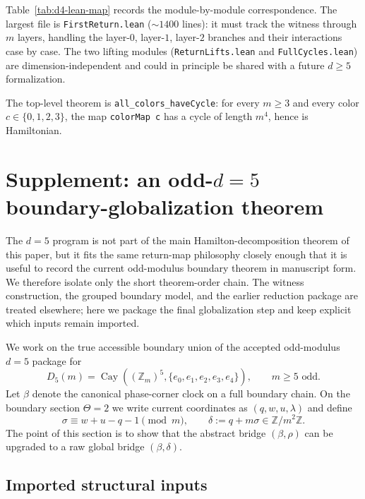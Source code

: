\documentclass[11pt]{article}
\newcommand{\Zm}{\mathbb Z_m}
\begin{document}
Table~\ref{tab:d4-lean-map} records the module-by-module correspondence.
The largest file is \texttt{FirstReturn.lean} (${\sim}1400$ lines): it must track the witness through $m$ layers, handling the layer-$0$, layer-$1$, layer-$2$ branches and their interactions case by case.
The two lifting modules (\texttt{ReturnLifts.lean} and \texttt{FullCycles.lean}) are dimension-independent and could in principle be shared with a future $d\ge 5$ formalization.

The top-level theorem is \texttt{all\_colors\_haveCycle}: for every $m\ge 3$ and every color $c\in\{0,1,2,3\}$, the map \texttt{colorMap~c} has a cycle of length $m^4$, hence is Hamiltonian.




\section{Supplement: an odd-$d=5$ boundary-globalization theorem}\label{sec:d5}

The $d=5$ program is not part of the main Hamilton-decomposition theorem of this paper, but it fits the same return-map philosophy closely enough that it is useful to record the current odd-modulus boundary theorem in manuscript form.
We therefore isolate only the short theorem-order chain.
The witness construction, the grouped boundary model, and the earlier reduction package are treated elsewhere; here we package the final globalization step and keep explicit which inputs remain imported.

We work on the true accessible boundary union of the accepted odd-modulus $d=5$ package for
\[
D_5(m)=\operatorname{Cay}((\Zm)^5,\{e_0,e_1,e_2,e_3,e_4\}),
\qquad m\ge 5\text{ odd}.
\]
Let $\beta$ denote the canonical phase-corner clock on a full boundary chain.
On the boundary section $\Theta=2$ we write current coordinates as $(q,w,u,\lambda)$ and define
\[
\sigma \equiv w+u-q-1 \pmod m,
\qquad
\delta := q + m\sigma \in \mathbb Z/m^2\mathbb Z.
\]
The point of this section is to show that the abstract bridge $(\beta,\rho)$ can be upgraded to a raw global bridge $(\beta,\delta)$.

\subsection{Imported structural inputs}
\end{document}
